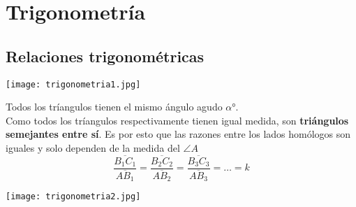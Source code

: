 \chapter*{Trigonometría}
\setcounter{chapter}{1}
\setcounter{section}{0}

\section{Relaciones trigonométricas}
\begin{center}
    \texttt{[image: trigonometria1.jpg]}
\end{center}
Todos los tríangulos tienen el mismo ángulo agudo $\alpha$°.\\
Como todos los tríangulos respectivamente tienen igual medida, son \textbf{triángulos semejantes entre sí}. Es por esto que las razones entre los lados homólogos son iguales y solo dependen de la medida del $\angle A$
$$\frac{\overline{B_1 C_1}}{\overline{AB_1}} = \frac{\overline{B_2C_2}}{\overline{AB_2}} = \frac{\overline{B_3C_3}}{\overline{AB_3}} = \dots = k$$

\begin{center}
    \texttt{[image: trigonometria2.jpg]}
\end{center}


